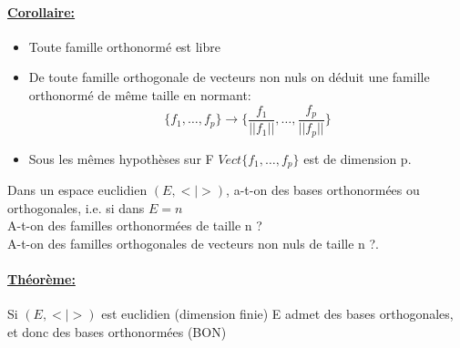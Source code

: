 \documentclass{article}
\begin{document}
\paragraph{\underline{Corollaire:}}
\begin{itemize}
    \item Toute famille orthonormé est libre
    \item De toute famille orthogonale de vecteurs non nuls on déduit une famille orthonormé de même taille en normant:
$$
\{f_1, \dots, f_p\} \rightarrow \{\frac{f_1}{||f_1||}, \dots, \frac{f_p}{||f_p||}\}
$$
    \item Sous les mêmes hypothèses sur F $Vect\{f_1, \dots, f_p\}$ est de dimension p.
\end{itemize}

Dans un espace euclidien $(E, <|>)$, a-t-on des bases orthonormées ou orthogonales, i.e. si dans $E = n$\\
A-t-on des familles orthonormées de taille n ? \\
A-t-on des familles orthogonales de vecteurs non nuls de taille n ?.

\paragraph{\underline{Théorème:}} Si $(E, <|>)$ est euclidien (dimension finie) E admet des bases orthogonales, et donc des bases orthonormées (BON)

\newpage
\end{document}
